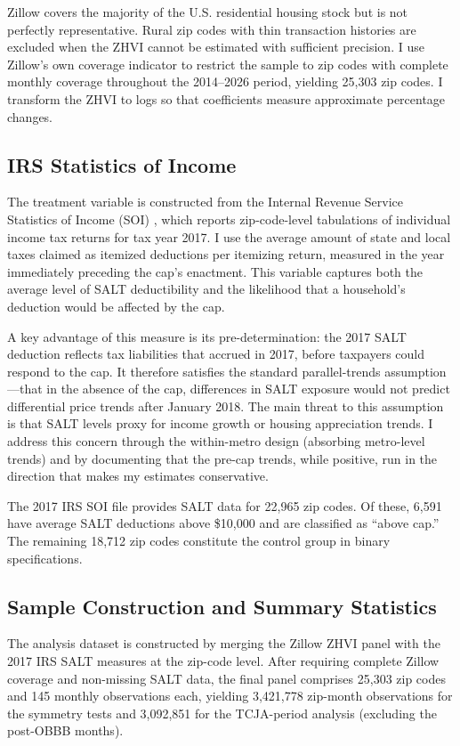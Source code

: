 \documentclass[12pt]{article}
\begin{document}
Zillow covers the majority of the U.S. residential housing stock but is not perfectly representative. Rural zip codes with thin transaction histories are excluded when the ZHVI cannot be estimated with sufficient precision. I use Zillow's own coverage indicator to restrict the sample to zip codes with complete monthly coverage throughout the 2014--2026 period, yielding 25,303 zip codes. I transform the ZHVI to logs so that coefficients measure approximate percentage changes.

\subsection{IRS Statistics of Income}

The treatment variable is constructed from the Internal Revenue Service Statistics of Income (SOI) \citep{IRS2017}, which reports zip-code-level tabulations of individual income tax returns for tax year 2017. I use the average amount of state and local taxes claimed as itemized deductions per itemizing return, measured in the year immediately preceding the cap's enactment. This variable captures both the average level of SALT deductibility and the likelihood that a household's deduction would be affected by the cap.

A key advantage of this measure is its pre-determination: the 2017 SALT deduction reflects tax liabilities that accrued in 2017, before taxpayers could respond to the cap. It therefore satisfies the standard parallel-trends assumption---that in the absence of the cap, differences in SALT exposure would not predict differential price trends after January 2018. The main threat to this assumption is that SALT levels proxy for income growth or housing appreciation trends. I address this concern through the within-metro design (absorbing metro-level trends) and by documenting that the pre-cap trends, while positive, run in the direction that makes my estimates conservative.

The 2017 IRS SOI file provides SALT data for 22,965 zip codes. Of these, 6,591 have average SALT deductions above \$10,000 and are classified as ``above cap.'' The remaining 18,712 zip codes constitute the control group in binary specifications.

\subsection{Sample Construction and Summary Statistics}

The analysis dataset is constructed by merging the Zillow ZHVI panel with the 2017 IRS SALT measures at the zip-code level. After requiring complete Zillow coverage and non-missing SALT data, the final panel comprises 25,303 zip codes and 145 monthly observations each, yielding 3,421,778 zip-month observations for the symmetry tests and 3,092,851 for the TCJA-period analysis (excluding the post-OBBB months).
\end{document}
